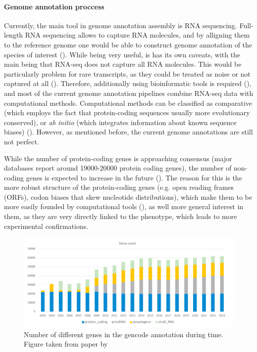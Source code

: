 \paragraph{Genome annotation proccess}

Currently, the main tool in genome annotation assembly is RNA sequencing.
Full-length RNA sequencing allows to capture RNA molecules,
and by alligning them to the reference genome one would be able to construct genome annotation of the species of interest (\cite{Salzberg2019}).
While being very useful, is has its own caveats, with the main being that RNA-seq does not capture all RNA molecules.
This would be particularly problem for rare transcripts, as they could be treated as noise or not captured at all (\cite{Salzberg2019}).
Therefore, additionally using bioinformatic tools is required (\cite{Guigo2023}),
and most of the current genome annotation pipelines combine RNA-seq data with computational methods.
Computational methods can be classified as comparative (which employs the fact that protein-coding sequences usually more evolutionary conserved),
or \textit{ab initio} (which integrates information about known sequence biases) (\cite{Guigo2023}).
However, as mentioned before, the current genome annotations are still not perfect.

While the number of protein-coding genes is approaching consensus (major databases report around 19000-20000 protein coding genes),
the number of non-coding genes is expected to increase in the future (\cite{Amaral2023}).
The reason for this is the more robust structure of the protein-coding genes (e.g. open reading frames (ORFs),
codon biases that skew nucleotide distributions), which make them to be more easily founded by computational tools (\cite{Guigo2023}),
as well more general interest in them, as they are very directly linked to the phenotype, which leads to more experimental confirmations.


\begin{figure}
  \centering
  \includegraphics[width=\linewidth]{images/gencode.png}
  \caption{Number of different genes in the gencode annotation during time. Figure taken from paper by \textcite{Guigo2023}}
  \label{fig:gencode}
\end{figure}















